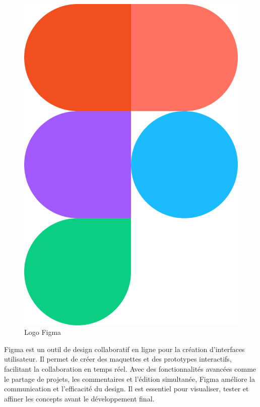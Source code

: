 \begin{figure}[htbp]
   \centering
   \includegraphics[scale=0.03]{Images/figma.png} 
   \caption{Logo Figma}
   \label{fig:figma}
\end{figure}
Figma est un outil de design collaboratif en ligne pour la création d'interfaces utilisateur. Il permet de créer des maquettes et des prototypes interactifs, facilitant la collaboration en temps réel. Avec des fonctionnalités avancées comme le partage de projets, les commentaires et l'édition simultanée, Figma améliore la communication et l'efficacité du design. Il est essentiel pour visualiser, tester et affiner les concepts avant le développement final.
\newline

